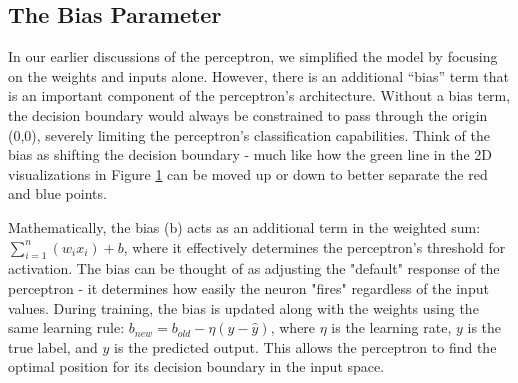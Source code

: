 \begin{figure}[h!]
\begin{tcolorbox}[every float=\centering, drop shadow, title=Linear Separability ,colback=white,colframe=WMgreen,
  colbacktitle=WMgreen,]
  \label{fig:linearsep}
 \end{tcolorbox}
\end{figure}

\subsection{The Bias Parameter}
In our earlier discussions of the perceptron, we simplified the model by focusing on the weights and inputs alone. However, there is an additional ``bias'' term that is an important component of the perceptron's architecture. Without a bias term, the decision boundary would always be constrained to pass through the origin (0,0), severely limiting the perceptron's classification capabilities. Think of the bias as shifting the decision boundary - much like how the green line in the 2D visualizations in Figure \ref{fig:linearsep} can be moved up or down to better separate the red and blue points.

Mathematically, the bias (b) acts as an additional term in the weighted sum: $\sum_{i=1}^n(w_ix_i)+b$, where it effectively determines the perceptron's threshold for activation. The bias can be thought of as adjusting the "default" response of the perceptron - it determines how easily the neuron "fires" regardless of the input values. During training, the bias is updated along with the weights using the same learning rule: $b_{new}=b_{old}-\eta(y-\hat{y})$, where $\eta$ is the learning rate, $y$ is the true label, and $\hat{y}$ is the predicted output. This allows the perceptron to find the optimal position for its decision boundary in the input space.
 
